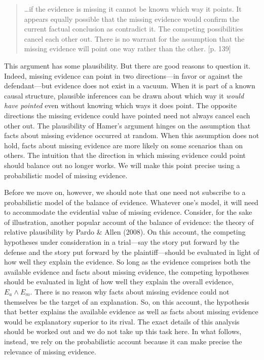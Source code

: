 \documentclass[
  10pt,
  dvipsnames,enabledeprecatedfontcommands]{scrartcl}
\begin{document}
\begin{quote}
\dots if the evidence is missing it cannot be known which way it points.
It appears equally possible that the missing evidence would confirm the current factual conclusion as contradict it. The competing possibilities cancel each other out. There is no warrant for the assumption that the missing evidence will point one way rather than the other. [p. 139]
\end{quote}

\noindent This argument has some plausibility. But there are good
reasons to question it. Indeed, missing evidence can point in two
directions---in favor or against the defendant---but evidence does not
exist in a vacuum. When it is part of a known causal structure,
plausible inferences can be drawn about which way it \emph{would have
pointed} even without knowing which ways it does point. The opposite
directions the missing evidence could have pointed need not always
cancel each other out. The plausibility of Hamer's argument hinges on
the assumption that facts about missing evidence occurred at random.
When this assumption does not hold, facts about missing evidence are
more likely on some scenarios than on others. The intuition that the
direction in which missing evidence could point should balance out no
longer works. We will make this point precise using a probabilistic
model of missing evidence.

Before we move on, however, we should note that one need not subscribe
to a probabilistic model of the balance of evidence. Whatever one's
model, it will need to accommodate the evidential value of missing
evidence. Consider, for the sake of illustration, another popular
account of the balance of evidence: the theory of relative plausibility
by Pardo \& Allen (2008). On this account, the competing hypotheses
under consideration in a trial---say the story put forward by the
defense and the story put forward by the plaintiff---should be evaluated
in light of how well they explain the evidence. So long as the evidence
comprises both the available evidence and facts about missing evidence,
the competing hypotheses should be evaluated in light of how well they
explain the overall evidence, \(E_a\wedge E_m\). There is no reason why
facts about missing evidence could not themselves be the target of an
explanation. So, on this account, the hypothesis that better explains
the available evidence as well as facts about missing evidence would be
explanatory superior to its rival. The exact details of this analysis
should be worked out and we do not take up this task here. In what
follows, instead, we rely on the probabilistic account because it can
make precise the relevance of missing evidence.
\end{document}
